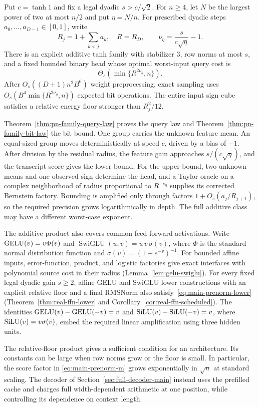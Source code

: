 \begin{theorem}
\label{thm:main-carrier}
Put $c=\tanh1$ and fix a legal dyadic $s>c/\sqrt2$.
For $n\ge4$, let $N$ be the largest power of two at most $n/2$
and put $\eta=N/n$. For prescribed dyadic steps
$a_0,\ldots,a_{D-1}\in[0,1]$, write
\[
 R_j=1+\sum_{k<j}a_k,\quad R=R_D,\qquad
 \nu_\eta=\frac{s}{c\sqrt\eta}-1.
\]
There is an explicit additive tanh family with stabilizer $3$,
row norms at most $s$, and a fixed bounded binary head whose
optimal worst-input query cost is
\[
 \Theta_s(\min\{R^{2\nu_\eta},n\}).
\]
After $O_s((D+1)n^2B^6)$ weight preprocessing, exact sampling
uses $O_s(B^4\min\{R^{2\nu_\eta},n\})$ expected bit operations.
The entire input sign cube satisfies a relative energy floor
stronger than $R_j^2/12$.
\end{theorem}

Theorem~\ref{thm:pn-family-query-law} proves the query law and
Theorem~\ref{thm:pn-family-bit-law} the bit bound.
One group carries the unknown feature mean. An equal-sized group
moves deterministically at speed $c$, driven by a bias of $-1$.
After division by the residual radius, the feature gain approaches
$s/(c\sqrt\eta)$, and the transcript score gives the lower bound. For
the upper bound, two unknown means and one observed sign determine
the head, and a Taylor oracle on a complex neighborhood of radius
proportional to $R^{-\nu_\eta}$ supplies its corrected Bernstein
factory. Rounding is amplified only through factors
$1+O_s(a_j/R_{j+1})$, so the required precision grows logarithmically
in depth. The full additive class may have a different worst-case
exponent.

The additive product also covers common feed-forward activations.
Write $\operatorname{GELU}(v)=v\Phi(v)$ and
$\operatorname{SwiGLU}(u,v)=u\,v\,\sigma(v)$, where $\Phi$ is
the standard normal distribution function and
$\sigma(v)=(1+e^{-v})^{-1}$. For bounded affine inputs,
error-function, product, and logistic factories give exact interfaces
with polynomial source cost in their radius
(Lemma~\ref{lem:gelu-swiglu}). For every fixed legal dyadic gain
$s\ge2$, affine GELU and SwiGLU lower constructions with an explicit
relative floor and a final RMSNorm also
satisfy~\eqref{eq:main-prenorm-lower}
(Theorem~\ref{thm:real-ffn-lower} and
Corollary~\ref{cor:real-ffn-scheduled}). The identities
$\operatorname{GELU}(v)-\operatorname{GELU}(-v)=v$ and $\operatorname{SiLU}(v)-\operatorname{SiLU}(-v)=v$, where
$\operatorname{SiLU}(v)=v\sigma(v)$, embed the required linear amplification using
three hidden units.

The relative-floor product gives a sufficient condition for an
architecture. Its constants can be large when row norms grow or
the floor is small. In particular, the score factor in
\eqref{eq:main-prenorm-m} grows exponentially in $\sqrt n$ at
standard scaling. The decoder of Section~\ref{sec:full-decoder-main}
instead uses the prefilled cache and charges full width-dependent
arithmetic at one position, while controlling its dependence on
context length.
